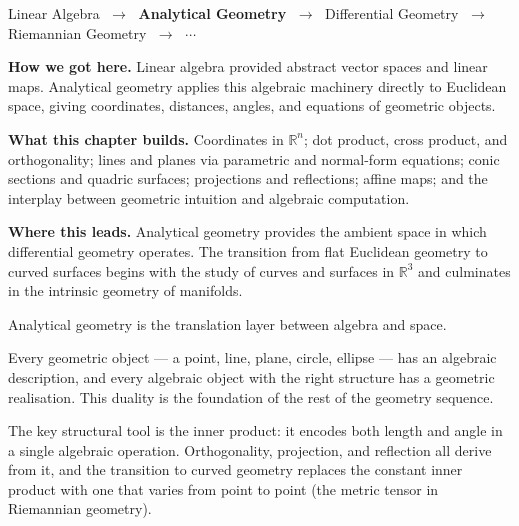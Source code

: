 
\begin{tcolorbox}[
  colback=gray!6,
  colframe=gray!40,
  arc=2pt,
  left=8pt, right=8pt, top=6pt, bottom=6pt,
  title={\small\textbf{Where You Are in the Journey}},
  fonttitle=\small\bfseries
]
\begin{center}
\small
Linear Algebra
$\;\to\;$ \textbf{Analytical Geometry}
$\;\to\;$ Differential Geometry
$\;\to\;$ Riemannian Geometry
$\;\to\;$ $\cdots$
\end{center}

\medskip
\noindent\textbf{How we got here.}
Linear algebra provided abstract vector spaces and linear maps.
Analytical geometry applies this algebraic machinery directly to
Euclidean space, giving coordinates, distances, angles, and
equations of geometric objects.

\medskip
\noindent\textbf{What this chapter builds.}
Coordinates in $\mathbb{R}^n$; dot product, cross product, and
orthogonality; lines and planes via parametric and normal-form
equations; conic sections and quadric surfaces; projections and
reflections; affine maps; and the interplay between geometric
intuition and algebraic computation.

\medskip
\noindent\textbf{Where this leads.}
Analytical geometry provides the ambient space in which
differential geometry operates.
The transition from flat Euclidean geometry to curved surfaces
begins with the study of curves and surfaces in $\mathbb{R}^3$
and culminates in the intrinsic geometry of manifolds.
\end{tcolorbox}
\vspace{1em}

\begin{tcolorbox}[
  colback=gray!6,
  colframe=gray!40,
  arc=2pt,
  left=8pt, right=8pt, top=6pt, bottom=6pt,
  title={\small\textbf{Structural Role: Analytical Geometry — Algebra Meets Space}},
  fonttitle=\small\bfseries
]
Analytical geometry is the translation layer between algebra and
space.

Every geometric object — a point, line, plane, circle, ellipse —
has an algebraic description, and every algebraic object with
the right structure has a geometric realisation.
This duality is the foundation of the rest of the geometry
sequence.

The key structural tool is the inner product: it encodes both
length and angle in a single algebraic operation.
Orthogonality, projection, and reflection all derive from it,
and the transition to curved geometry replaces the constant
inner product with one that varies from point to point
(the metric tensor in Riemannian geometry).
\end{tcolorbox}
\vspace{1em}

